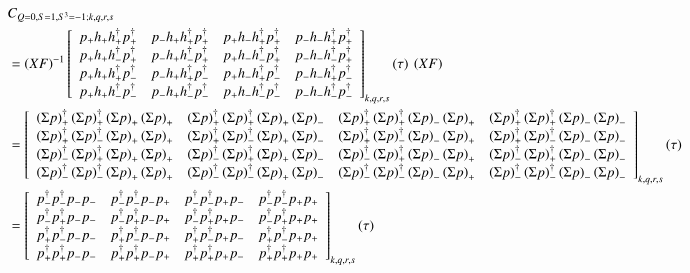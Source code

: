 \begin{equation*}
  \begin{aligned}
    &C_{Q=0,S=1,S^3=-1;k,q,r,s} \\
    &=\left(XF\right)^{-1} \left[ 
    {\begin{array}{cccc}
      \cor{+}{+}{+}{+} & \cor{+}{+}{+}{-} & \cor{+}{+}{-}{+} & \cor{+}{+}{-}{-} \\
      \cor{+}{-}{+}{+} & \cor{+}{-}{+}{-} & \cor{+}{-}{-}{+} & \cor{+}{-}{-}{-} \\
      \cor{-}{+}{+}{+} & \cor{-}{+}{+}{-} & \cor{-}{+}{-}{+} & \cor{-}{+}{-}{-} \\
      \cor{-}{-}{+}{+} & \cor{-}{-}{+}{-} & \cor{-}{-}{-}{+} & \cor{-}{-}{-}{-} \\
    \end{array}}
    \right]_{k,q,r,s} (\tau)\:\left(XF\right) \\
    &= \left[ 
    {\begin{array}{cccc}
      \dscor{+}{+}{+}{+} & \dscor{+}{+}{+}{-} & \dscor{+}{+}{-}{+} & \dscor{+}{+}{-}{-} \\
      \dscor{+}{-}{+}{+} & \dscor{+}{-}{+}{-} & \dscor{+}{-}{-}{+} & \dscor{+}{-}{-}{-} \\
      \dscor{-}{+}{+}{+} & \dscor{-}{+}{+}{-} & \dscor{-}{+}{-}{+} & \dscor{-}{+}{-}{-} \\
      \dscor{-}{-}{+}{+} & \dscor{-}{-}{+}{-} & \dscor{-}{-}{-}{+} & \dscor{-}{-}{-}{-} \\
    \end{array}}
    \right]_{k,q,r,s} (\tau) \\
    &= \left[ 
    {\begin{array}{cccc}
      \dcor{-}{-}{-}{-} & \dcor{-}{-}{-}{+} & \dcor{-}{-}{+}{-} & \dcor{-}{-}{+}{+} \\
      \dcor{-}{+}{-}{-} & \dcor{-}{+}{-}{+} & \dcor{-}{+}{+}{-} & \dcor{-}{+}{+}{+} \\
      \dcor{+}{-}{-}{-} & \dcor{+}{-}{-}{+} & \dcor{+}{-}{+}{-} & \dcor{+}{-}{+}{+} \\
      \dcor{+}{+}{-}{-} & \dcor{+}{+}{-}{+} & \dcor{+}{+}{+}{-} & \dcor{+}{+}{+}{+} \\
    \end{array} } \right]_{k,q,r,s} (\tau) \\
  \end{aligned}
\end{equation*}
  \renewcommand{\cor}[4]{p_{#4}h_{#3}h^\dagger_{#2}p^\dagger_{#1}}
